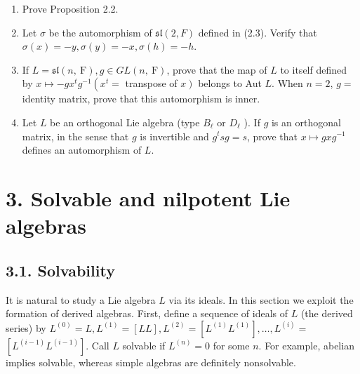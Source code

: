 \documentclass[10pt]{article}
\begin{document}
\begin{enumerate}
  \item Prove Proposition 2.2.
  \item Let $\sigma$ be the automorphism of $\mathfrak{s l}(2, F)$ defined in (2.3). Verify that $\sigma(x)=-y, \sigma(y)=-x, \sigma(h)=-h$.
  \item If $L=\mathfrak{s l}(n, \mathrm{~F}), g \in G L(n, \mathrm{~F})$, prove that the map of $L$ to itself defined by $x \mapsto-g x^{t} g^{-1}\left(x^{t}=\right.$ transpose of $\left.x\right)$ belongs to Aut $L$. When $n=2$, $g=$ identity matrix, prove that this automorphism is inner.
  \item Let $L$ be an orthogonal Lie algebra (type $B_{\ell}$ or $D_{\ell}$ ). If $g$ is an orthogonal matrix, in the sense that $g$ is invertible and $g^{t} s g=s$, prove that $x \mapsto g x g^{-1}$ defines an automorphism of $L$.
\end{enumerate}

\section*{3. Solvable and nilpotent Lie algebras}
\subsection*{3.1. Solvability}
It is natural to study a Lie algebra $L$ via its ideals. In this section we exploit the formation of derived algebras. First, define a sequence of ideals of $L$ (the derived series) by $L^{(0)}=L, L^{(1)}=[L L], L^{(2)}=\left[L^{(1)} L^{(1)}\right], \ldots, L^{(i)}=$ $\left[L^{(i-1)} L^{(i-1)}\right]$. Call $L$ solvable if $L^{(n)}=0$ for some $n$. For example, abelian implies solvable, whereas simple algebras are definitely nonsolvable.
\end{document}
